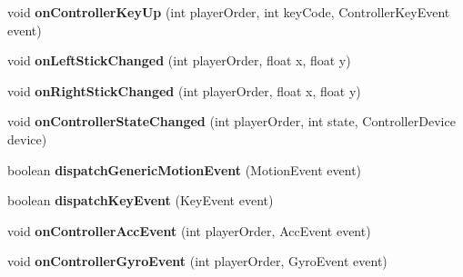 \begin{DoxyCompactItemize}
void {\bfseries on\+Controller\+Key\+Up} (int player\+Order, int key\+Code, Controller\+Key\+Event event)
\item 
\mbox{\label{classorg_1_1cocos2dx_1_1lib_1_1GameControllerNibiru_a21f353b12e1492cf46d25b55e2813999}} 
void {\bfseries on\+Left\+Stick\+Changed} (int player\+Order, float x, float y)
\item 
\mbox{\label{classorg_1_1cocos2dx_1_1lib_1_1GameControllerNibiru_acb15cbb77dfbc91fbf1d8f841bef8e97}} 
void {\bfseries on\+Right\+Stick\+Changed} (int player\+Order, float x, float y)
\item 
\mbox{\label{classorg_1_1cocos2dx_1_1lib_1_1GameControllerNibiru_ad42d7517715b4d0006f8a0ae65a354ea}} 
void {\bfseries on\+Controller\+State\+Changed} (int player\+Order, int state, Controller\+Device device)
\item 
\mbox{\label{classorg_1_1cocos2dx_1_1lib_1_1GameControllerNibiru_a01c649189fb04000d656c61e4348c9e3}} 
boolean {\bfseries dispatch\+Generic\+Motion\+Event} (Motion\+Event event)
\item 
\mbox{\label{classorg_1_1cocos2dx_1_1lib_1_1GameControllerNibiru_a8b61f0cd40311ac2d6fd8fccd71f651a}} 
boolean {\bfseries dispatch\+Key\+Event} (Key\+Event event)
\item 
\mbox{\label{classorg_1_1cocos2dx_1_1lib_1_1GameControllerNibiru_a0bad0f6ae551b89c3f4a3c803f9eef4c}} 
void {\bfseries on\+Controller\+Acc\+Event} (int player\+Order, Acc\+Event event)
\item 
\mbox{\label{classorg_1_1cocos2dx_1_1lib_1_1GameControllerNibiru_a20a633162329429973aedaadc38c2fdb}} 
void {\bfseries on\+Controller\+Gyro\+Event} (int player\+Order, Gyro\+Event event)
\item 
\mbox{\label{classorg_1_1cocos2dx_1_1lib_1_1GameControllerNibiru_ad889cbc56a5d66162d9d19a7339f6869}} 

\end{DoxyCompactItemize}
